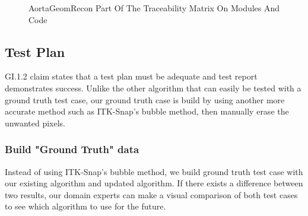 \begin{figure}[H]
    \centering
    \caption[AortaGeomRecon Part Of The Traceability Matrix On Modules And Code]{AortaGeomRecon Part Of The Traceability Matrix On Modules And Code}
    \label{fig_agr_mtm_modules_code}
\end{figure}

\subsection{Test Plan}

GI.1.2 claim states that a test plan must be adequate and test report demonstrates success. Unlike the other algorithm that can easily be tested with a ground truth test case, our ground truth case is build by using another more accurate method such as ITK-Snap's bubble method, then manually erase the unwanted pixels.

\subsubsection{Build "Ground Truth" data}
Instead of using ITK-Snap's bubble method, we build ground truth test case with our existing algorithm and updated algorithm. If there exists a difference between two results, our domain experts can make a visual comparison of both test cases to see which algorithm to use for the future.

